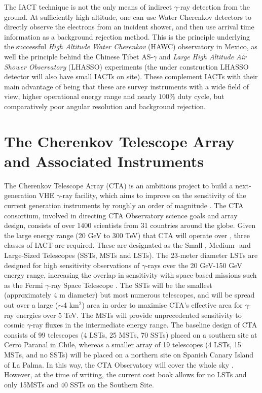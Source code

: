The IACT technique is not the only means of indirect $\gamma$-ray detection from the ground. At sufficiently high altitude, one can use Water Cherenkov detectors to directly observe the electrons from an incident shower, and then use arrival time information as a background rejection method. This is the principle underlying the successful \textit{High Altitude Water Cherenkov} (HAWC) observatory in Mexico, as well the principle behind the Chinese Tibet AS-$\gamma$ and \textit{Large High Altitude Air Shower Observatory} (LHASSO) experiments (the under construction LHASSO detector will also have small IACTs on site). These complement IACTs with their main advantage of being that these are survey instruments with a wide field of view, higher operational energy range and nearly $100\%$ duty cycle, but comparatively poor angular resolution and background rejection. 

\section{The Cherenkov Telescope Array and Associated Instruments}
The Cherenkov Telescope Array (CTA) is an ambitious project to build a next-generation VHE $\gamma$-ray facility, which aims to improve on the sensitivity of the current generation instruments by roughly an order of magnitude \cite{scienceCTA}. The CTA consortium, involved in directing CTA Observatory science goals and array design, consists of over 1400 scientists from 31 countries around the globe. Given the large energy range (20 GeV to 300 TeV) that CTA will operate  over \cite{scienceCTA}, three classes of IACT are required. These are designated as the Small-, Medium- and Large-Sized Telescopes (SSTs, MSTs and LSTs). The 23-meter diameter LSTs are designed for high sensitivity observations of $\gamma$-rays over the 20 GeV-150 GeV energy range, increasing the overlap in sensitivity with space based missions such as the Fermi $\gamma$-ray Space Telescope \cite{Fermi}. The SSTs will be the smallest (approximately 4 m diameter) but most numerous telescopes, and will be spread out over a large ($\sim$4 km$^2$) area in order to maximise CTA's effective area for $\gamma$-ray energies over 5 TeV. The MSTs will provide unprecedented sensitivity to cosmic $\gamma$-ray fluxes in the intermediate energy range. The baseline design of CTA consists of 99 telescopes (4 LSTs, 25 MSTs, 70 SSTs) placed on a southern site at Cerro Paranal in Chile, whereas a smaller array of 19 telescopes (4 LSTs, 15 MSTs, and no SSTs) will be placed on a northern site on Spanish Canary Island of La Palma. In this way, the CTA Observatory will cover the whole sky \cite{scienceCTA}. However, at the time of writing, the current cost book allows for no LSTs and only 15MSTs and 40 SSTs on the Southern Site. 

